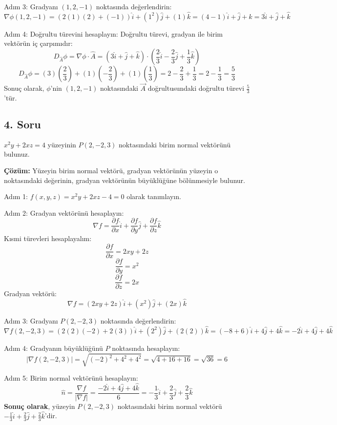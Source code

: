 \documentclass[11pt,letterpaper,twocolumn]{fenbil}
\begin{document}
Adım 3: Gradyanı $(1, 2, -1)$ noktasında değerlendirin:
\[
\nabla \phi (1, 2, -1) = (2(1)(2) + (-1))\hat{i} + (1^2)\hat{j} + (1)\hat{k} = (4 - 1)\hat{i} + \hat{j} + \hat{k} = 3\hat{i} + \hat{j} + \hat{k}
\]

Adım 4: Doğrultu türevini hesaplayın:
Doğrultu türevi, gradyan ile birim vektörün iç çarpımıdır:
\[
D_{\hat{A}}\phi = \nabla \phi \cdot \hat{A} = (3\hat{i} + \hat{j} + \hat{k}) \cdot \left(\frac{2}{3}\hat{i} - \frac{2}{3}\hat{j} + \frac{1}{3}\hat{k}\right)
\]
\[
D_{\hat{A}}\phi = (3)\left(\frac{2}{3}\right) + (1)\left(-\frac{2}{3}\right) + (1)\left(\frac{1}{3}\right) = 2 - \frac{2}{3} + \frac{1}{3} = 2 - \frac{1}{3} = \frac{5}{3}
\]
Sonuç olarak, $\phi$'nin $(1, 2, -1)$ noktasındaki $\vec{A}$ doğrultusundaki doğrultu türevi $\frac{5}{3}$'tür.

\subsection*{4. Soru}
$x^2y + 2xz = 4$ yüzeyinin $P(2, -2, 3)$ noktasındaki birim normal vektörünü bulunuz.

\textbf{Çözüm:}
Yüzeyin birim normal vektörü, gradyan vektörünün yüzeyin o noktasındaki değerinin, gradyan vektörünün büyüklüğüne bölünmesiyle bulunur.

Adım 1: $f(x, y, z) = x^2y + 2xz - 4 = 0$ olarak tanımlayın.

Adım 2: Gradyan vektörünü hesaplayın:
\[
\nabla f = \frac{\partial f}{\partial x}\hat{i} + \frac{\partial f}{\partial y}\hat{j} + \frac{\partial f}{\partial z}\hat{k}
\]
Kısmi türevleri hesaplayalım:
\[
\frac{\partial f}{\partial x} = 2xy + 2z
\]
\[
\frac{\partial f}{\partial y} = x^2
\]
\[
\frac{\partial f}{\partial z} = 2x
\]
Gradyan vektörü:
\[
\nabla f = (2xy + 2z)\hat{i} + (x^2)\hat{j} + (2x)\hat{k}
\]

Adım 3: Gradyanı $P(2, -2, 3)$ noktasında değerlendirin:
\[
\nabla f(2, -2, 3) = (2(2)(-2) + 2(3))\hat{i} + (2^2)\hat{j} + (2(2))\hat{k} = (-8 + 6)\hat{i} + 4\hat{j} + 4\hat{k} = -2\hat{i} + 4\hat{j} + 4\hat{k}
\]

Adım 4: Gradyanın büyüklüğünü $P$ noktasında hesaplayın:
\[
|\nabla f(2, -2, 3)| = \sqrt{(-2)^2 + 4^2 + 4^2} = \sqrt{4 + 16 + 16} = \sqrt{36} = 6
\]

Adım 5: Birim normal vektörünü hesaplayın:
\[
\hat{n} = \frac{\nabla f}{|\nabla f|} = \frac{-2\hat{i} + 4\hat{j} + 4\hat{k}}{6} = -\frac{1}{3}\hat{i} + \frac{2}{3}\hat{j} + \frac{2}{3}\hat{k}
\]
\textbf{Sonuç olarak}, yüzeyin $P(2, -2, 3)$ noktasındaki birim normal vektörü $-\frac{1}{3}\hat{i} + \frac{2}{3}\hat{j} + \frac{2}{3}\hat{k}$'dir.
\end{document}
